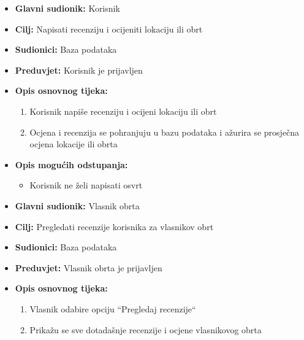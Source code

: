             \noindent{}
				\begin{itemize}
					\item \textbf{Glavni sudionik: } Korisnik
					\item \textbf{Cilj: }Napisati recenziju i ocijeniti lokaciju ili obrt
					\item \textbf{Sudionici: } Baza podataka 
					\item \textbf{Preduvjet: } Korisnik je prijavljen
					\item \textbf{Opis osnovnog tijeka: }
					\begin{enumerate}
						\item Korisnik napiše recenziju i ocijeni lokaciju ili obrt
						\item Ocjena i recenzija se pohranjuju u bazu podataka i ažurira se prosječna ocjena lokacije ili obrta 
					\end{enumerate}
                    \item \textbf{Opis mogućih odstupanja:}
					\begin{itemize}
						\item Korisnik ne želi napisati osvrt
					\end{itemize}
				\end{itemize} 

            \noindent{}
			    \begin{itemize}
					\item \textbf{Glavni sudionik: } Vlasnik obrta
					\item \textbf{Cilj: }Pregledati recenzije korisnika za vlasnikov obrt 
					\item \textbf{Sudionici: } Baza podataka 
					\item \textbf{Preduvjet: } Vlasnik obrta je prijavljen
					\item \textbf{Opis osnovnog tijeka: }
					\begin{enumerate}
						\item Vlasnik odabire opciju “Pregledaj recenzije“
						\item Prikažu se sve dotadašnje recenzije i ocjene vlasnikovog obrta
					\end{enumerate}
				\end{itemize} 	
			
	\pagebreak
